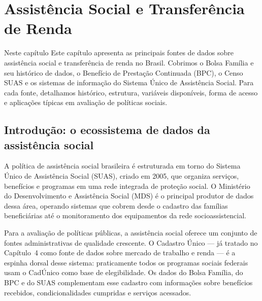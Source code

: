 
\chapter{Assistência Social e Transferência de Renda}

\begin{boxdestaque}{Neste capítulo}
Este capítulo apresenta as principais fontes de dados sobre assistência social e transferência de renda no Brasil. Cobrimos o Bolsa Família e seu histórico de dados, o Benefício de Prestação Continuada (BPC), o Censo SUAS e os sistemas de informação do Sistema Único de Assistência Social. Para cada fonte, detalhamos histórico, estrutura, variáveis disponíveis, forma de acesso e aplicações típicas em avaliação de políticas sociais.
\end{boxdestaque}

\section{Introdução: o ecossistema de dados da assistência social}

A política de assistência social brasileira é estruturada em torno do Sistema Único de Assistência Social (SUAS), criado em 2005, que organiza serviços, benefícios e programas em uma rede integrada de proteção social. O Ministério do Desenvolvimento e Assistência Social (MDS) é o principal produtor de dados dessa área, operando sistemas que cobrem desde o cadastro das famílias beneficiárias até o monitoramento dos equipamentos da rede socioassistencial.

Para a avaliação de políticas públicas, a assistência social oferece um conjunto de fontes administrativas de qualidade crescente. O Cadastro Único — já tratado no Capítulo~4 como fonte de dados sobre mercado de trabalho e renda — é a espinha dorsal desse sistema: praticamente todos os programas sociais federais usam o CadÚnico como base de elegibilidade. Os dados do Bolsa Família, do BPC e do SUAS complementam esse cadastro com informações sobre benefícios recebidos, condicionalidades cumpridas e serviços acessados.

